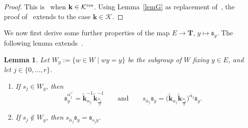 \documentclass[pdftex]{sigma}
\numberwithin{equation}{section}
\newtheorem{Lemma}[Theorem]{Lemma}
\begin{document}
\begin{proof}
This is~\cite[Proposition~5.28]{SSV2} when $\mathbf{k}\in\mathcal{K}^{{\rm res}}$. Using Lemma~\ref{lemG} as replacement of~\cite[Lemma~5.27]{SSV2},
the proof of~\cite[Proposition~5.28]{SSV2} extends to the case $\mathbf{k}\in\mathcal{K}$.
\end{proof}

We now first derive some further properties of the map $E\rightarrow\mathbf{T}$, $y\mapsto\mathfrak{s}_y$.
The following lemma extends~\cite[Lemma~5.3]{SSV2}.

\begin{Lemma}\label{lemsy}
Let $W_y:=\{w\in W \mid wy=y\}$ be the subgroup of $W$ fixing $y\in E$, and let ${j\in\{0,\dots,r\}}$.
\begin{enumerate}\itemsep=0pt
\item[$(1)$] If $s_j\in W_y$, then
\[
\mathfrak{s}_y^{\overline{\alpha}_j^\vee}=\widetilde{\mathbf{k}}_{\alpha_j}^{-1}\widetilde{\mathbf{k}}_{\frac{\alpha_j}{2}}^{-1}\qquad \text{and}
\qquad s_{\overline{\alpha}_j}\mathfrak{s}_y=\bigl(\widetilde{\mathbf{k}}_{\alpha_j}\widetilde{\mathbf{k}}_{\frac{\alpha_j}{2}}\bigr)^{\overline{\alpha}_j}\mathfrak{s}_y.
\]
\item[$(2)$] If $s_j\not\in W_y$, then $s_{\overline{\alpha}_j}\mathfrak{s}_y=\mathfrak{s}_{s_jy}$.
\end{enumerate}
\end{Lemma}
\end{document}
